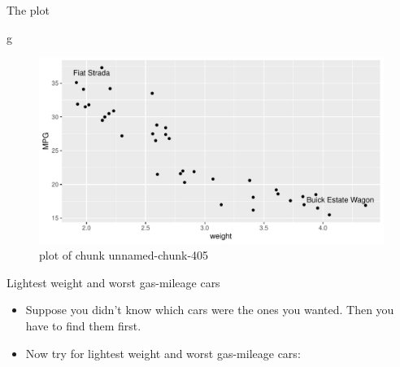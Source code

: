 \documentclass[ignorenonframetext,]{beamer}
\newenvironment{Shaded}{\begin{snugshade}}{\end{snugshade}}
\newcommand{\DataTypeTok}[1]{\textcolor[rgb]{0.13,0.29,0.53}{#1}}
\newcommand{\KeywordTok}[1]{\textcolor[rgb]{0.13,0.29,0.53}{\textbf{#1}}}
\newcommand{\NormalTok}[1]{#1}
\newcommand{\OperatorTok}[1]{\textcolor[rgb]{0.81,0.36,0.00}{\textbf{#1}}}
\newcommand{\StringTok}[1]{\textcolor[rgb]{0.31,0.60,0.02}{#1}}
\providecommand{\tightlist}{%
  \setlength{\itemsep}{0pt}\setlength{\parskip}{0pt}}
\begin{document}
\begin{frame}[fragile]{The plot}
\protect\hypertarget{the-plot-6}{}

\begin{Shaded}
\begin{Highlighting}[]
\NormalTok{g}
\end{Highlighting}
\end{Shaded}

\begin{figure}
\centering
\includegraphics{figure/unnamed-chunk-405-1.pdf}
\caption{plot of chunk unnamed-chunk-405}
\end{figure}

\end{frame}

\begin{frame}[fragile]{Lightest weight and worst gas-mileage cars}
\protect\hypertarget{lightest-weight-and-worst-gas-mileage-cars}{}

\begin{itemize}
\tightlist
\item
  Suppose you didn't know which cars were the ones you wanted. Then you
  have to find them first.
\item
  Now try for lightest weight and worst gas-mileage cars:
\end{itemize}

\begin{Shaded}
\end{Shaded}

\end{frame}
\end{document}
